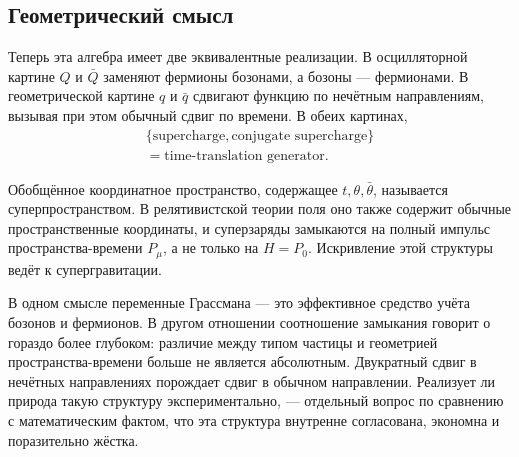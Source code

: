 \begin{classroomqa}
\end{classroomqa}

\begin{classroomqa}
\end{classroomqa}


\subsection{Геометрический смысл}

Теперь эта алгебра имеет две эквивалентные реализации. В осцилляторной картине \(Q\) и \(\bar Q\) заменяют фермионы бозонами, а бозоны — фермионами. В геометрической картине \(q\) и \(\bar q\) сдвигают функцию по нечётным направлениям, вызывая при этом обычный сдвиг по времени. В обеих картинах,
\begin{equation}
\begin{gathered}
\{\text{supercharge},\text{conjugate supercharge}\}\\
=\text{time-translation generator}.
\end{gathered}
\end{equation}

Обобщённое координатное пространство, содержащее \(t,\theta,\bar\theta\), называется суперпространством. В релятивистской теории поля оно также содержит обычные пространственные координаты, и суперзаряды замыкаются на полный импульс пространства-времени \(P_\mu\), а не только на \(H=P_0\). Искривление этой структуры ведёт к супергравитации.

В одном смысле переменные Грассмана — это эффективное средство учёта бозонов и фермионов. В другом отношении соотношение замыкания говорит о гораздо более глубоком: различие между типом частицы и геометрией пространства-времени больше не является абсолютным. Двукратный сдвиг в нечётных направлениях порождает сдвиг в обычном направлении. Реализует ли природа такую структуру экспериментально, — отдельный вопрос по сравнению с математическим фактом, что эта структура внутренне согласована, экономна и поразительно жёстка.